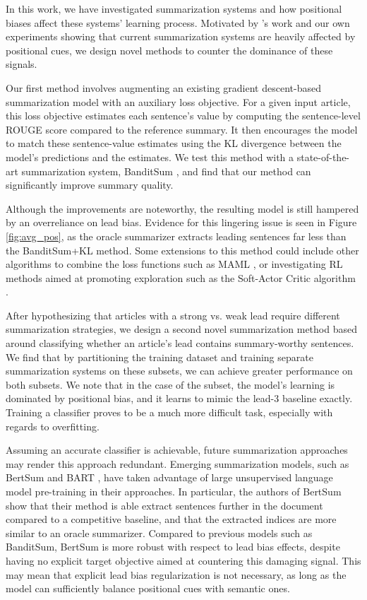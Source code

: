 In this work, we have investigated summarization systems and how positional biases affect these systems' learning process. Motivated by \cite{kedzie2018content}'s work and our own experiments showing that current summarization systems are heavily affected by positional cues, we design novel methods to counter the dominance of these signals.

Our first method involves augmenting an existing gradient descent-based summarization model with an auxiliary loss objective. For a given input article, this loss objective estimates each sentence's value by computing the sentence-level ROUGE score compared to the reference summary. It then encourages the model to match these sentence-value estimates using the KL divergence between the model's predictions and the estimates. We test this method with a state-of-the-art summarization system, BanditSum \parencite{dong2018banditsum}, and find that our method can significantly improve summary quality. 

Although the improvements are noteworthy, the resulting model is still hampered by an overreliance on lead bias. Evidence for this lingering issue is seen in Figure \ref{fig:avg_pos}, as the oracle summarizer extracts leading sentences far less than the BanditSum+KL method. Some extensions to this method could include other algorithms to combine the loss functions such as MAML \parencite{maml}, or investigating RL methods aimed at promoting exploration such as the Soft-Actor Critic algorithm \parencite{sac}.

After hypothesizing that articles with a strong vs. weak lead require different summarization strategies, we design a second novel summarization method based around classifying whether an article's lead contains summary-worthy sentences. We find that by partitioning the training dataset and training separate summarization systems on these subsets, we can achieve greater performance on both subsets. We note that in the case of the \Dearly{} subset, the model's learning is dominated by positional bias, and it learns to mimic the lead-3 baseline exactly. Training a classifier proves to be a much more difficult task, especially with regards to overfitting.

Assuming an accurate classifier is achievable, future summarization approaches may render this approach redundant. Emerging summarization models, such as BertSum and BART \parencite{bertsum, lewis2019bart}, have taken advantage of large unsupervised language model pre-training in their approaches. In particular, the authors of BertSum show that their method is able extract sentences further in the document compared to a competitive baseline, and that the extracted indices are more similar to an oracle summarizer. Compared to previous models such as BanditSum, BertSum is more robust with respect to lead bias effects, despite having no explicit target objective aimed at countering this damaging signal. This may mean that explicit lead bias regularization is not necessary, as long as the model can sufficiently balance positional cues with semantic ones.


